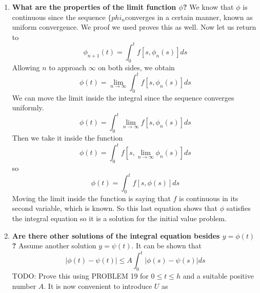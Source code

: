\begin{enumerate}
        \item \textbf{What are the properties of the limit function $\phi$?}
            \newline \indent
            We know that $\phi$ is continuous since the sequence ${\{phi_n}$converges in a certain manner, known as uniform convergence. We proof we used proves this as well. Now let us return to
            \begin{equation*}
                \phi_{n+1}(t) = \int_0^t f[s, \phi_n(s)] ds
            \end{equation*}
            Allowing $n$ to approach $\infty$ on both sides, we obtain
            \begin{equation*}
                \phi(t) = \lim_{n \rightarrow \infty} \int_0^t f[s, \phi_n(s)] ds
            \end{equation*}
            We can move the limit inside the integral since the sequence converges uniformly.
            \begin{equation*}
                \phi(t) = \int_0^t \lim_{n \rightarrow \infty} f[s, \phi_n(s)] ds
            \end{equation*}
            Then we take it inside the function
            \begin{equation*}
                \phi(t) = \int_0^t f[s, \lim_{n \rightarrow \infty} \phi_n(s)] ds
            \end{equation*}
            so
            \begin{equation*}
                \phi(t) = \int_0^t f[s, \phi(s)] ds
            \end{equation*}
            Moving the limit inside the function is saying that $f$ is continuous in its second variable, which is known. So this last equation shows that $\phi$ satisfies the integral equation so it is a solution for the initial value problem.
        \item \textbf{Are there other solutions of the integral equation besides $y = \phi(t)$?}
            \newline \indent
            Assume another solution $y = \psi(t)$. It can be shown that
            \begin{equation*}
                |\phi(t) - \psi(t)| \leq A\int_0^t |\phi(s) - \psi(s)| ds
            \end{equation*}
            TODO: Prove this using PROBLEM 19
            \newline
            for $0 \leq t \leq h$ and a suitable positive number $A$. It is now convenient to introduce $U$ as

\end{enumerate}
